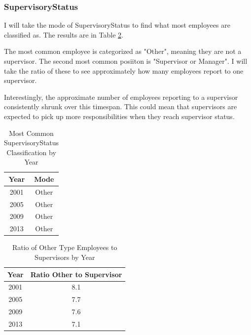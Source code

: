 \documentclass{article}
\begin{document}
        \subsubsection{SupervisoryStatus}
        I will take the mode of SupervisoryStatus to find what most employees are classified as. The results are in Table \ref{tab:12}.
        \par
        The most common employee is categorized as "Other", meaning they are not a supervisor. The second most common posiiton is "Supervisor or Manager". I will take the ratio of these to see approximately how many employees report to one supervisor.
        \par
        Interestingly, the approximate number of employees reporting to a supervisor consistently shrunk over this timespan. This could mean that supervisors are expected to pick up more responsibilities when they reach supervisor status.

            \begin{center}
                \begin{table}
                    \centering
                    \begin{tabular}{ |c|c| }
                        \hline
                        Year & Mode \\
                        \hline
                        2001 & Other \\
                        2005 & Other \\
                        2009 & Other \\
                        2013 & Other \\
                        \hline
                    \end{tabular}
                    \caption{Most Common SupervisoryStatus Classification by Year}
                    \label{tab:12}
                \end{table}
            \end{center}

            \begin{center}
                \begin{table}
                    \centering
                    \begin{tabular}{ |c|c| }
                        \hline
                        Year & Ratio Other to Supervisor \\
                        \hline
                        2001 & 8.1 \\
                        2005 & 7.7 \\
                        2009 & 7.6 \\
                        2013 & 7.1 \\
                        \hline
                    \end{tabular}
                    \caption{Ratio of Other Type Employees to Supervisors by Year}
                    \label{tab:12}
                \end{table}
            \end{center}
\end{document}
